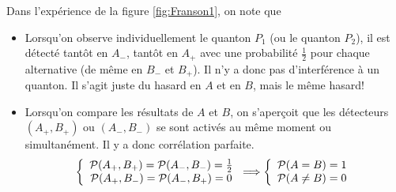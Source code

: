 Dans l'expérience de la figure \ref{fig:Franson1}, on note que

\begin{itemize}
\item Lorsqu'on observe individuellement le quanton $P_{1}$ (ou le quanton
$P_{2}$), il est détecté tantôt en $A_{-}$, tantôt en $A_{+}$ avec une
probabilité $\frac{1}{2}$ pour chaque alternative (de même en $B_{-}$ et
$B_{+}$). Il n'y a donc pas d'interférence à un quanton. Il s'agit juste du
hasard en $A$ et en $B$, mais le même hasard!

\item Lorsqu'on compare les résultats de $A$ et $B$, on s'aperçoit que les
détecteurs $(A_{+},B_{+})$ ou $(A_{-},B_{-})$ se sont activés au même moment
ou simultanément. Il y a donc corrélation parfaite.%
\begin{equation}
\left\{
\begin{array}
[c]{c}%
\mathcal{P}(A_{+},B_{+})=\mathcal{P}(A_{-},B_{-})=\frac{1}{2}\\
\mathcal{P}(A_{+},B_{-})=\mathcal{P}(A_{-},B_{+})=0
\end{array}
\right.  \Longrightarrow\left\{
\begin{array}
[c]{c}%
\mathcal{P}(A=B)=1\\
\mathcal{P}(A\neq B)=0
\end{array}
\right.
\end{equation}

\end{itemize}


